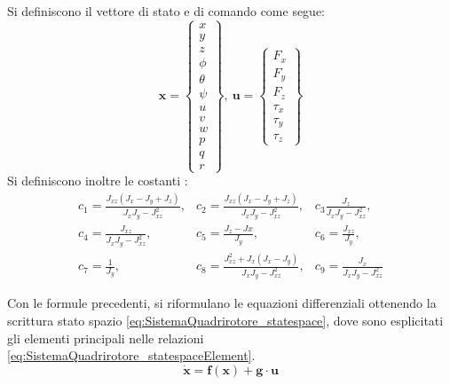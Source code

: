 Si definiscono il vettore di stato e di comando come segue:
\[ 
	\mathbf{x} = \begin{Bmatrix}
		x \\ y \\ z \\ \phi \\ \theta \\ \psi \\ u \\ v \\ w \\ p \\ q \\ r
	\end{Bmatrix}, \  \mathbf{u} = \begin{Bmatrix}
	F_x \\ F_y \\ F_z \\ \tau_x \\ \tau_y \\ \tau_z
	\end{Bmatrix}
\]
Si definiscono inoltre le costanti : 
\[ 
	\begin{matrix}
	c_1 = \frac{J_{xz} (J_x -J_y + J_z)}{J_x J_y- J_{xz}^2} , & c_2 = \frac{J_{xz} (J_x -J_y +J_z)}{J_x J_y-J_{xz}^2}, &c_3 \frac{J_z}{J_x J_y - J_{xz}^2}, \\
	c_4 = \frac{J_{xz}}{J_x J_y -J_{xz}^2} ,& c_5 = \frac{J_z - J x}{J_y},& c_6 = \frac{J_{xz}}{J_y}, \\
	c_7 = \frac{1}{J_y} ,& c_8 = \frac{J_{xz}^2 + J_x (J_x - J_y)}{J_x J_y - J_{xz}^2},& c_9 =  \frac{J_x}{J_x J_y -J_{xz}^2}
	\end{matrix}
\]

Con le formule precedenti, si riformulano le equazioni differenziali ottenendo la scrittura stato spazio \ref{eq:SistemaQuadrirotore_statespace}, dove sono esplicitati gli elementi principali nelle relazioni \ref{eq:SistemaQuadrirotore_statespaceElement}.
\begin{equation}\label{eq:SistemaQuadrirotore_statespace}
\mathbf{\dot{x}} = \mathbf{f(x)} + \mathbf{g} \cdot \mathbf{u}
\end{equation}

